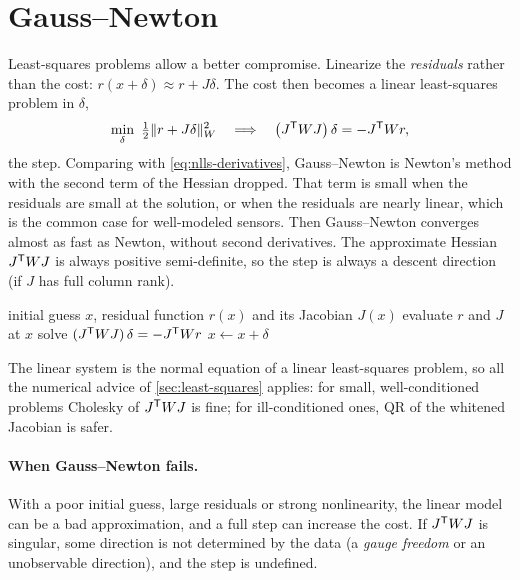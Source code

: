 \section{Gauss--Newton}
\label{sec:gauss-newton}

Least-squares problems allow a better compromise. Linearize the \emph{residuals} rather than the cost: $r(x + \delta) \approx r + J\delta$. The cost then
becomes a linear least-squares problem in $\delta$,
\begin{equation}
  \min_\delta\ \tfrac12\|r + J\delta\|_W^2
  \quad\Longrightarrow\quad
  \big(J^{\mathsf{T}} WJ\big)\,\delta = -J^{\mathsf{T}} Wr,
  \label{eq:gn-step}
\end{equation}
the  step. Comparing with \eqref{eq:nlls-derivatives}, Gauss--Newton is Newton's method with the second term of the Hessian dropped.
That term is small when the residuals are small at the solution, or when the residuals are nearly linear, which is the common case for
well-modeled sensors. Then Gauss--Newton converges almost as fast as Newton, without second derivatives. The approximate Hessian $J^{\mathsf{T}} WJ$ is
always positive semi-definite, so the step is always a descent direction (if $J$ has full column rank).

\begin{algorithm}[h]
\caption{Gauss--Newton}
\label{alg:gauss-newton}
\begin{algorithmic}[1]
\Require initial guess $x$, residual function $r(x)$ and its Jacobian $J(x)$
\Repeat
  \State evaluate $r$ and $J$ at $x$
  \State solve $(J^{\mathsf{T}} WJ)\,\delta = -J^{\mathsf{T}} Wr$ 
  \State $x \gets x + \delta$
\end{algorithmic}
\end{algorithm}

The linear system is the normal equation of a linear least-squares problem, so all the numerical advice of \cref{sec:least-squares} applies: for
small, well-conditioned problems Cholesky of $J^{\mathsf{T}} WJ$ is fine; for ill-conditioned ones, QR of the whitened Jacobian is safer.

\paragraph{When Gauss--Newton fails.} With a poor initial guess, large residuals or strong nonlinearity, the linear model can be a bad
approximation, and a full step can increase the cost. If $J^{\mathsf{T}} WJ$ is singular, some direction is not determined by the data (a \emph{gauge freedom}
or an unobservable direction), and the step is undefined.


